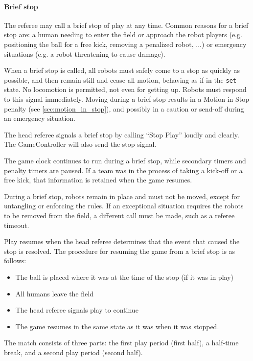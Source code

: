 \paragraph{Brief stop}
\label{sec:state_emergency_stop}

The referee may call a brief stop of play at any time. Common reasons for a brief stop are: a human needing to enter the field or approach the robot players (e.g. positioning the ball for a free kick, removing a penalized robot, ...) or emergency situations (e.g. a robot threatening to cause damage).

When a brief stop is called, all robots must safely come to a stop as quickly as possible, and then remain still and cease all motion, behaving as if in the \texttt{set} state. No locomotion is permitted, not even for getting up. Robots must respond to this signal immediately. Moving during a brief stop results in a Motion in Stop penalty (see \cref{sec:motion_in_stop}), and possibly in a caution or send-off during an emergency situation.

The head referee signals a brief stop by calling ``Stop Play'' loudly and clearly. The GameController will also send the stop signal.

The game clock continues to run during a brief stop, while secondary timers and penalty timers are paused. If a team was in the process of taking a kick-off or a free kick, that information is retained when the game resumes.

During a brief stop, robots remain in place and must not be moved, except for untangling or enforcing the rules. If an exceptional situation requires the robots to be removed from the field, a different call must be made, such as a referee timeout.

Play resumes when the head referee determines that the event that caused the stop is resolved. The procedure for resuming the game from a brief stop is as follows:
\begin{itemize}
  \item The ball is placed where it was at the time of the stop (if it was in play)
  \item All humans leave the field
  \item The head referee signals play to continue
  \item The game resumes in the same state as it was when it was stopped.
\end{itemize}


The match consists of three parts: the first play period (first half), a half-time break, and a second play period (second half).

